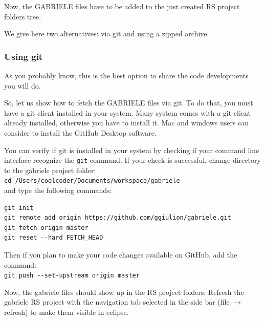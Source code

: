 \documentclass{book}
\begin{document}

\vskip2mm
Now, the GABRIELE files have to be added to the just created RS project folders tree.

We give here two alternatives: via git and using a zipped archive.

\subsubsection{Using git}

As you probably know, this is the best option to share the code developments you will do.

So, let us show how to fetch the GABRIELE files via git. To do that, you must have a git client installed in your system. Many system comes with a git client already installed, otherwise you have to install it. Mac and windows users can consider to install the GitHub Desktop software.

You can verify if git is installed in your system by checking if your command line interface recognize the \verb+git+ command.  
If your check is successful, change directory to the gabriele project folder:\\
\verb+cd /Users/coolcoder/Documents/workspace/gabriele+\\
and type the following commands:
\begin{verbatim}
git init
git remote add origin https://github.com/ggiulion/gabriele.git
git fetch origin master
git reset --hard FETCH_HEAD
\end{verbatim}

Then if you plan to make your code changes available on GitHub, add the command:\\
\verb+git push --set-upstream origin master+

Now, the gabriele files should show up in the RS project folders.
Refresh the gabriele RS project with the navigation tab selected in the side bar (file $\rightarrow$ refresh) to make them visible in eclipse.
\end{document}
